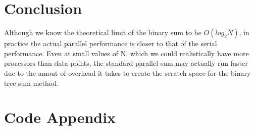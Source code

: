 \documentclass[a4paper, 11pt]{article}
\begin{document}
\section*{Conclusion}

Although we know the theoretical limit of the binary sum to be $O(log_2 N)$, in practice the actual parallel performance is closer to that of the serial performance. Even at small values of N, which we could realistically have more processors than data points, the standard parallel sum may actually run faster due to the amout of overhead it takes to create the scratch space for the binary tree sum method.

\newpage
\section*{Code Appendix}

\end{document}

